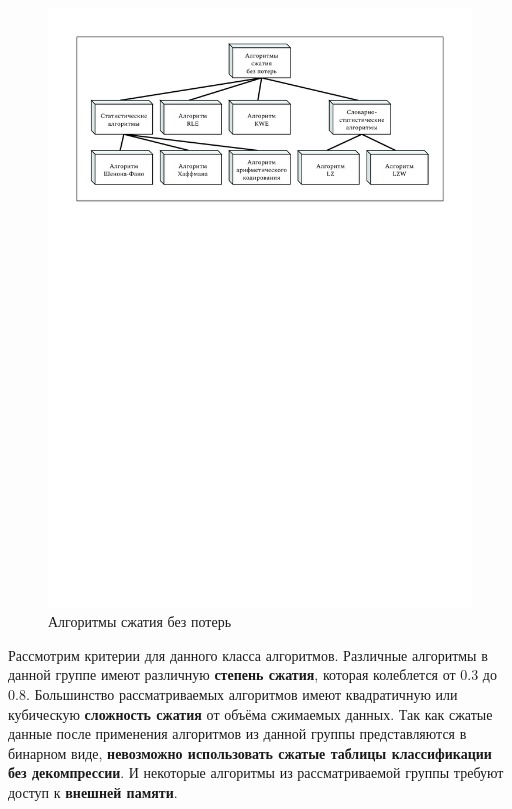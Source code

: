 \documentclass[oneside,final,12pt]{extarticle}
\begin{document}
            \begin{figure}[h]
                \centering
                \includegraphics[trim=0 1100 0 0,clip,width=\textwidth]{algorithms.pdf}
                \caption{Алгоритмы сжатия без потерь}
            \end{figure}           
            Рассмотрим критерии для данного класса алгоритмов. Различные алгоритмы в данной группе имеют различную \textbf{степень сжатия}, 
            которая колеблется от 0.3 до 0.8. Большинство рассматриваемых алгоритмов имеют квадратичную или кубическую \textbf{сложность сжатия} 
            от объёма сжимаемых данных. Так как сжатые данные после применения алгоритмов из данной группы представляются в бинарном виде,
            \textbf{невозможно использовать сжатые таблицы классификации без декомпрессии}. И некоторые алгоритмы из рассматриваемой группы требуют доступ к \textbf{внешней памяти}.
\end{document}
